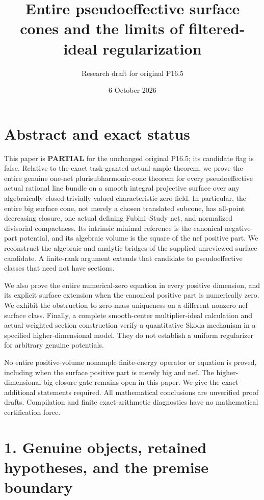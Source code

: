 \documentclass[
  10pt,
]{article}
\title{Entire pseudoeffective surface cones and the limits of
filtered-ideal regularization}
\author{Research draft for original P16.5}
\date{6 October 2026}
\begin{document}
\maketitle

\section{Abstract and exact status}\label{abstract-and-exact-status}

This paper is \textbf{PARTIAL} for the unchanged original P16.5; its
candidate flag is false. Relative to the exact task-granted actual-ample
theorem, we prove the entire genuine one-net plurisubharmonic-cone
theorem for every pseudoeffective actual rational line bundle on a
smooth integral projective surface over any algebraically closed
trivially valued characteristic-zero field. In particular, the entire
big surface cone, not merely a chosen translated subcone, has all-point
decreasing closure, one actual defining Fubini--Study net, and
normalized divisorial compactness. Its intrinsic minimal reference is
the canonical negative-part potential, and its algebraic volume is the
square of the nef positive part. We reconstruct the algebraic and
analytic bridges of the supplied unreviewed surface candidate. A
finite-rank argument extends that candidate to pseudoeffective classes
that need not have sections.

We also prove the entire numerical-zero equation in every positive
dimension, and its explicit surface extension when the canonical
positive part is numerically zero. We exhibit the obstruction to
zero-mass uniqueness on a different nonzero nef surface class. Finally,
a complete smooth-center multiplier-ideal calculation and actual
weighted section construction verify a quantitative Skoda mechanism in a
specified higher-dimensional model. They do not establish a uniform
regularizer for arbitrary genuine potentials.

No entire positive-volume nonample finite-energy operator or equation is
proved, including when the surface positive part is merely big and nef.
The higher-dimensional big closure gate remains open in this paper. We
give the exact additional statements required. All mathematical
conclusions are unverified proof drafts. Compilation and finite
exact-arithmetic diagnostics have no mathematical certification force.

\section{1. Genuine objects, retained hypotheses, and the premise
boundary}\label{genuine-objects-retained-hypotheses-and-the-premise-boundary}
\end{document}
